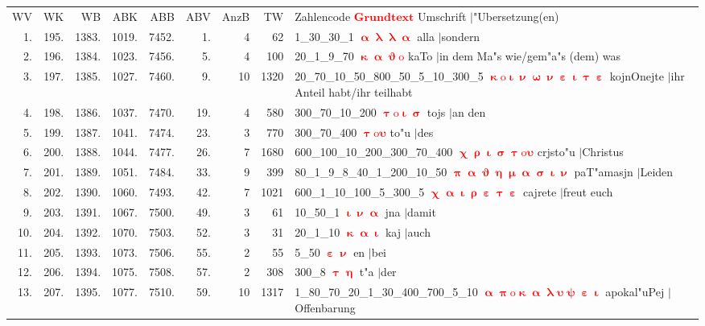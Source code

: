 \documentclass[a4paper,10pt,landscape]{article}
\begin{document}
\begin{tabular}{rrrrrrrrp{120mm}}
WV&WK&WB&ABK&ABB&ABV&AnzB&TW&Zahlencode \textcolor{red}{$\boldsymbol{Grundtext}$} Umschrift $|$"Ubersetzung(en)\\
1.&195.&1383.&1019.&7452.&1.&4&62&1\_30\_30\_1 \textcolor{red}{$\boldsymbol{\upalpha\uplambda\uplambda\upalpha}$} alla $|$sondern\\
2.&196.&1384.&1023.&7456.&5.&4&100&20\_1\_9\_70 \textcolor{red}{$\boldsymbol{\upkappa\upalpha\upvartheta\mathrm{o}}$} kaTo $|$in dem Ma"s wie/gem"a"s (dem) was\\
3.&197.&1385.&1027.&7460.&9.&10&1320&20\_70\_10\_50\_800\_50\_5\_10\_300\_5 \textcolor{red}{$\boldsymbol{\upkappa\mathrm{o}\upiota\upnu\upomega\upnu\upepsilon\upiota\uptau\upepsilon}$} kojnOnejte $|$ihr Anteil habt/ihr teilhabt\\
4.&198.&1386.&1037.&7470.&19.&4&580&300\_70\_10\_200 \textcolor{red}{$\boldsymbol{\uptau\mathrm{o}\upiota\upsigma}$} tojs $|$an den\\
5.&199.&1387.&1041.&7474.&23.&3&770&300\_70\_400 \textcolor{red}{$\boldsymbol{\uptau\mathrm{o}\upsilon}$} to"u $|$des\\
6.&200.&1388.&1044.&7477.&26.&7&1680&600\_100\_10\_200\_300\_70\_400 \textcolor{red}{$\boldsymbol{\upchi\uprho\upiota\upsigma\uptau\mathrm{o}\upsilon}$} crjsto"u $|$Christus\\
7.&201.&1389.&1051.&7484.&33.&9&399&80\_1\_9\_8\_40\_1\_200\_10\_50 \textcolor{red}{$\boldsymbol{\uppi\upalpha\upvartheta\upeta\upmu\upalpha\upsigma\upiota\upnu}$} paT"amasjn $|$Leiden\\
8.&202.&1390.&1060.&7493.&42.&7&1021&600\_1\_10\_100\_5\_300\_5 \textcolor{red}{$\boldsymbol{\upchi\upalpha\upiota\uprho\upepsilon\uptau\upepsilon}$} cajrete $|$freut euch\\
9.&203.&1391.&1067.&7500.&49.&3&61&10\_50\_1 \textcolor{red}{$\boldsymbol{\upiota\upnu\upalpha}$} jna $|$damit\\
10.&204.&1392.&1070.&7503.&52.&3&31&20\_1\_10 \textcolor{red}{$\boldsymbol{\upkappa\upalpha\upiota}$} kaj $|$auch\\
11.&205.&1393.&1073.&7506.&55.&2&55&5\_50 \textcolor{red}{$\boldsymbol{\upepsilon\upnu}$} en $|$bei\\
12.&206.&1394.&1075.&7508.&57.&2&308&300\_8 \textcolor{red}{$\boldsymbol{\uptau\upeta}$} t"a $|$der\\
13.&207.&1395.&1077.&7510.&59.&10&1317&1\_80\_70\_20\_1\_30\_400\_700\_5\_10 \textcolor{red}{$\boldsymbol{\upalpha\uppi\mathrm{o}\upkappa\upalpha\uplambda\upsilon\uppsi\upepsilon\upiota}$} apokal"uPej $|$Offenbarung\\

\end{tabular}
\end{document}
